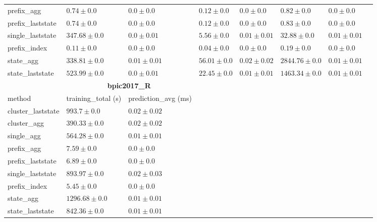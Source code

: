 \begin{table}[!htbp]
{\begin{tabular}{llllllll}
				 prefix\_agg & $0.74 \pm 0.0$ & $\mathbf{0.0 \pm 0.0}$ & $0.12 \pm 0.0$ & $\mathbf{0.0 \pm 0.0}$ & $0.82 \pm 0.0$ & $\mathbf{0.0 \pm 0.0}$ \\ 
				 prefix\_laststate & $0.74 \pm 0.0$ & $\mathbf{0.0 \pm 0.0}$ & $0.12 \pm 0.0$ & $\mathbf{0.0 \pm 0.0}$ & $0.83 \pm 0.0$ & $\mathbf{0.0 \pm 0.0}$ \\ 
				 single\_laststate & $347.68 \pm 0.0$ & $\mathbf{0.0 \pm 0.01}$ & $5.56 \pm 0.0$ & $0.01 \pm 0.01$ & $32.88 \pm 0.0$ & $0.01 \pm 0.01$ \\ 
				 prefix\_index & $\mathbf{0.11 \pm 0.0}$ & $\mathbf{0.0 \pm 0.0}$ & $\mathbf{0.04 \pm 0.0}$ & $\mathbf{0.0 \pm 0.0}$ & $\mathbf{0.19 \pm 0.0}$ & $\mathbf{0.0 \pm 0.0}$ \\ 
				 state\_agg & $338.81 \pm 0.0$ & $0.01 \pm 0.01$ & $56.01 \pm 0.0$ & $0.02 \pm 0.02$ & $2844.76 \pm 0.0$ & $0.01 \pm 0.01$ \\ 
				 state\_laststate & $523.99 \pm 0.0$ & $\mathbf{0.0 \pm 0.01}$ & $22.45 \pm 0.0$ & $0.01 \pm 0.01$ & $1463.34 \pm 0.0$ & $0.01 \pm 0.01$ \\ 
				 \bottomrule
				 \toprule
				 & \multicolumn{2}{c}{{\bfseries bpic2017\_R}} \\ \cmidrule(lr){2-3} \cmidrule(lr){4-5} \cmidrule(lr){6-7}
				 method  & training\_total (s) & prediction\_avg (ms) \\ \midrule
				 cluster\_laststate & $993.7 \pm 0.0$ & $0.02 \pm 0.02$ \\ 
				 cluster\_agg & $390.33 \pm 0.0$ & $0.02 \pm 0.02$ \\ 
				 single\_agg & $564.28 \pm 0.0$ & $0.01 \pm 0.01$ \\ 
				 prefix\_agg & $7.59 \pm 0.0$ & $\mathbf{0.0 \pm 0.0}$ \\ 
				 prefix\_laststate & $6.89 \pm 0.0$ & $\mathbf{0.0 \pm 0.0}$ \\ 
				 single\_laststate & $893.97 \pm 0.0$ & $0.02 \pm 0.03$ \\ 
				 prefix\_index & $\mathbf{5.45 \pm 0.0}$ & $\mathbf{0.0 \pm 0.0}$ \\ 
				 state\_agg & $1296.68 \pm 0.0$ & $0.01 \pm 0.01$ \\ 
				 state\_laststate & $842.36 \pm 0.0$ & $0.01 \pm 0.01$ \\ 
				 \bottomrule

		\end{tabular}%
	}
	
	
\end{table}

